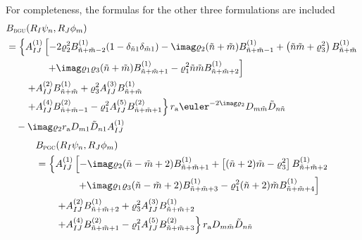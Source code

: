 For completeness, the formulas for the other three formulations are included
\begin{equation}
\begin{aligned}
	&B_{\textsc{bgu}}(R_I\psi_n,R_J\phi_m) \\
	 &= \left\{A_{IJ}^{(1)}\left[-2\varrho_2^2 B_{\tilde{n}+\tilde{m}-2}^{(1)}(1-\delta_{\tilde{n}1}\delta_{\tilde{m}1}) - \imag\varrho_2(\tilde{n}+\tilde{m})B_{\tilde{n}+\tilde{m}-1}^{(1)} + \left(\tilde{n}\tilde{m}+\varrho_3^2\right)B_{\tilde{n}+\tilde{m}}^{(1)}\right. \right. \\
	  &{\hskip4em\relax}\left. \left. + \imag\varrho_1\varrho_3(\tilde{n}+\tilde{m})B_{\tilde{n}+\tilde{m}+1}^{(1)} - \varrho_1^2\tilde{n}\tilde{m}B_{\tilde{n}+\tilde{m}+2}^{(1)}\right] \right. \\
	 &{\hskip2em\relax}\left. +A_{IJ}^{(2)}B_{\tilde{n}+\tilde{m}}^{(1)} + \varrho_3^2A_{IJ}^{(3)} B_{\tilde{n}+\tilde{m}}^{(1)}\right.\\
	 &{\hskip2em\relax}\left. +A_{IJ}^{(4)}B_{\tilde{n}+\tilde{m}-1}^{(2)} -\varrho_1^2A_{IJ}^{(5)} B_{\tilde{n}+\tilde{m}+1}^{(2)}
	 \right\}r_{\mathrm{a}}\euler^{-2\imag \varrho_2}D_{m\tilde{m}}\tilde{D}_{n\tilde{n}}\\
	 &\quad-\imag\varrho_2 r_{\mathrm{a}} D_{m1}\tilde{D}_{n1}A_{IJ}^{(1)}
\end{aligned}
\end{equation}
\begin{equation}
\begin{aligned}
	&B_{\textsc{pgc}}(R_I\psi_n,R_J\phi_m) \\
	 &= \left\{A_{IJ}^{(1)}\left[-\imag\varrho_2(\tilde{n}-\tilde{m}+2)B_{\tilde{n}+\tilde{m}+1}^{(1)} + \left[(\tilde{n}+2)\tilde{m}-\varrho_3^2\right]B_{\tilde{n}+\tilde{m}+2}^{(1)}\right. \right. \\
	  &{\hskip4em\relax}\left. \left. + \imag\varrho_1\varrho_3(\tilde{n}-\tilde{m}+2)B_{\tilde{n}+\tilde{m}+3}^{(1)} - \varrho_1^2(\tilde{n}+2)\tilde{m}B_{\tilde{n}+\tilde{m}+4}^{(1)}\right] \right. \\
	 &{\hskip2em\relax}\left. +A_{IJ}^{(2)}B_{\tilde{n}+\tilde{m}+2}^{(1)} + \varrho_3^2A_{IJ}^{(3)} B_{\tilde{n}+\tilde{m}+2}^{(1)}\right.\\
	 &{\hskip2em\relax}\left. +A_{IJ}^{(4)}B_{\tilde{n}+\tilde{m}+1}^{(2)} -\varrho_1^2A_{IJ}^{(5)} B_{\tilde{n}+\tilde{m}+3}^{(2)}
	 \right\}r_{\mathrm{a}}D_{m\tilde{m}}\tilde{D}_{n\tilde{n}}
\end{aligned}
\end{equation}
